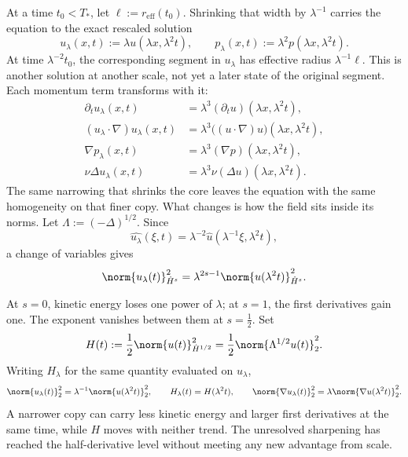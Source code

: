 
At a time \(t_0<T_*\), let \(\ell:=r_{\mathrm{eff}}(t_0)\). Shrinking that width by \(\lambda^{-1}\) carries the equation to the exact rescaled solution
\[
  u_\lambda(x,t)
  :=
  \lambda u(\lambda x,\lambda^2t),
  \qquad
  p_\lambda(x,t)
  :=
  \lambda^2p(\lambda x,\lambda^2t).
\]
At time \(\lambda^{-2}t_0\), the corresponding segment in \(u_\lambda\) has effective radius \(\lambda^{-1}\ell\). This is another solution at another scale, not yet a later state of the original segment. Each momentum term transforms with it:
\[
\begin{aligned}
  \partial_tu_\lambda(x,t)
  &=
  \lambda^3(\partial_tu)(\lambda x,\lambda^2t),
  \\
  (u_\lambda\cdot\nabla)u_\lambda(x,t)
  &=
  \lambda^3\bigl((u\cdot\nabla)u\bigr)(\lambda x,\lambda^2t),
  \\
  \nabla p_\lambda(x,t)
  &=
  \lambda^3(\nabla p)(\lambda x,\lambda^2t),
  \\
  \nu\Delta u_\lambda(x,t)
  &=
  \lambda^3\nu(\Delta u)(\lambda x,\lambda^2t).
\end{aligned}
\]
The same narrowing that shrinks the core leaves the equation with the same homogeneity on that finer copy. What changes is how the field sits inside its norms. Let \(\Lambda:=(-\Delta)^{1/2}\). Since
\[
  \widehat{u_\lambda}(\xi,t)
  =
  \lambda^{-2}\widehat u(\lambda^{-1}\xi,\lambda^2t),
\]
a change of variables gives
\[
  \norm{u_\lambda(t)}_{\dot H^s}^2
  =
  \lambda^{2s-1}
  \norm{u(\lambda^2t)}_{\dot H^s}^2.
\]


At \(s=0\), kinetic energy loses one power of \(\lambda\); at \(s=1\), the first derivatives gain one. The exponent vanishes between them at \(s=\tfrac12\). Set
\[
  H(t)
  :=
  \frac12\norm{u(t)}_{\dot H^{1/2}}^2
  =
  \frac12\norm{\Lambda^{1/2}u(t)}_2^2.
\]
Writing \(H_\lambda\) for the same quantity evaluated on \(u_\lambda\),
\[
  \norm{u_\lambda(t)}_2^2
  =
  \lambda^{-1}\norm{u(\lambda^2t)}_2^2,
  \qquad
  H_\lambda(t)=H(\lambda^2t),
  \qquad
  \norm{\nabla u_\lambda(t)}_2^2
  =
  \lambda\norm{\nabla u(\lambda^2t)}_2^2.
\]
A narrower copy can carry less kinetic energy and larger first derivatives at the same time, while \(H\) moves with neither trend. The unresolved sharpening has reached the half-derivative level without meeting any new advantage from scale.


